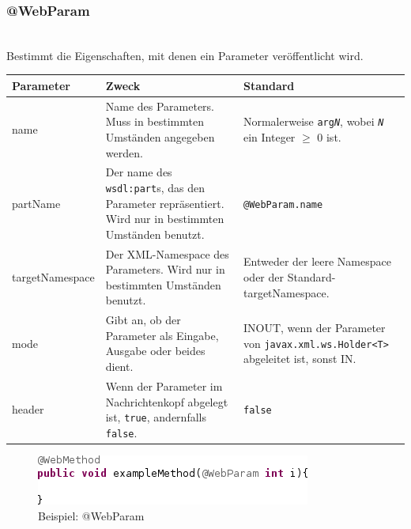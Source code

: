\documentclass[runningheads]{llncs}
\newcommand{\anntabwidth}{\textwidth}
\begin{document}
    \subsubsection{@WebParam}\ \\
      Bestimmt die Eigenschaften, mit denen ein Parameter veröffentlicht wird.\\
    \begin{tabulary}{\anntabwidth}{|l|L|L|}
    \hline
    \textbf{Parameter} & \textbf{Zweck} & \textbf{Standard} \\
    \hline
      name &
      Name des Parameters. Muss in bestimmten Umständen angegeben werden. &
      Normalerweise \texttt{arg\textit{N}}, wobei \texttt{\textit{N}} ein Integer $\geq$ 0 ist. \\
    \hline
      partName &
      Der name des \texttt{wsdl:part}s, das den Parameter repräsentiert. Wird nur in bestimmten Umständen benutzt. &
      \texttt{@WebParam.name} \\
    \hline
      targetNamespace &
      Der XML-Namespace des Parameters. Wird nur in bestimmten Umständen benutzt. &
      Entweder der leere Namespace oder der Standard-targetNamespace. \\
    \hline
      mode &
      Gibt an, ob der Parameter als Eingabe, Ausgabe oder beides dient. &
      INOUT, wenn der Parameter von \texttt{javax.xml.ws.Holder<T>} abgeleitet ist, sonst IN. \\
    \hline
      header &
      Wenn der Parameter im Nachrichtenkopf abgelegt ist, \texttt{true}, andernfalls \texttt{false}. &
      \texttt{false} \\
    \hline
    \end{tabulary} \vfill
    \begin{figure}[tbh]
      \centering
      \includegraphics[width=\textwidth]{../images/AtWebParam.png}
      \caption{Beispiel: @WebParam}
      \label{fig:wp}
    \end{figure} \vfill
\end{document}
